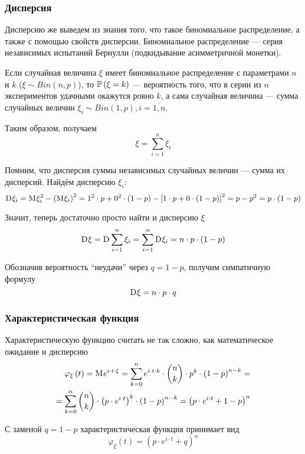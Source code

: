 \subsubsection{Дисперсия}
Дисперсию же выведем из знания того,
что такое биномиальное распределение, а также с помощью свойств дисперсии.
Биномиальное распределение --- серия независимых испытаний Бернулли
(подкидывание асимметричной монетки).

Если случайная величина $\xi$ имеет биномиальное распределение
с параметрами $n$ и $k$ ($\xi \sim Bin\left( n,p \right)$), то
$\mathbb{P}\left( \xi=k \right)$ --- вероятность того,
что в серии из $n$ экспериментов удачными окажутся ровно $k$,
а сама случайная величина --- сумма случайных величин
$\xi_i \sim Bin\left( 1,p \right), i=\overline{1,n}$.

Таким образом, получаем
$$\xi = \sum_{i=1}^n \xi_i$$

Помним, что дисперсия суммы независимых случайных величин --- сумма
их дисперсий. Найдём дисперсию $\xi_i$:
$$\mathrm{D}_{} \xi_i
    = \mathrm{M}_{} \xi_i^2 - \left( \mathrm{M}_{} \xi_i \right)^2
    = 1^2 \cdot p + 0^2 \cdot \left( 1-p \right)
        - \left[ 1 \cdot p + 0 \cdot \left( 1-p \right) \right]^2
    = p - p^2 = p \cdot \left( 1-p \right)$$

Значит, теперь достаточно просто найти и дисперсию $\xi$
$$\mathrm{D}_{} \xi
    = \mathrm{D}_{} \sum_{i=1}^n \xi_i
    = \sum_{i=1}^n \mathrm{D}_{} \xi_i
    = n \cdot p \cdot \left( 1-p \right)$$

Обозначив вероятность ``неудачи'' через $q=1-p$, получим симпатичную формулу
$$\mathrm{D}_{} \xi = n \cdot p \cdot q$$

\subsubsection{Характеристическая функция}
Характеристическую функцию считать не так сложно,
как математическое ожидание и дисперсию
\begin{align*}
    \varphi_{\xi}\left( t \right)
        = \mathrm{M}_{} e^{i \cdot t \cdot \xi}
        = \sum_{k=0}^{n} e^{i \cdot t \cdot k}
            \cdot \binom{n}{k} \cdot p^k \cdot \left( 1-p \right)^{n-k} = \\
        = \sum_{k=0}^{n} \binom{n}{k}
            \cdot \left(p \cdot e^{i \cdot t}\right)^k
            \cdot \left( 1-p \right)^{n-k}
        = \left( p \cdot e^{i\cdot t} + 1 - p \right)^n
\end{align*}

С заменой $q=1-p$ характеристическая функция принимает вид
$$\varphi_{\xi}\left( t \right) = \left( p \cdot e^{i\cdot t} + q \right)^n$$

